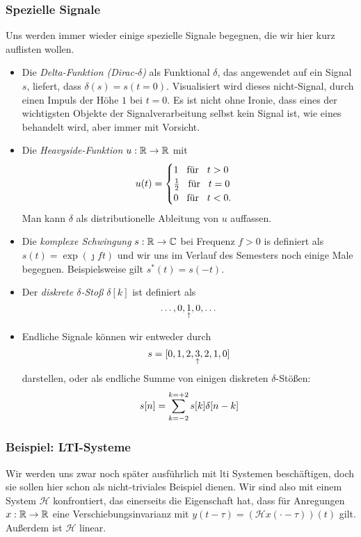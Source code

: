 \subsubsection{Spezielle Signale}
%
Uns werden immer wieder einige spezielle Signale begegnen, die wir hier kurz auflisten wollen.
\begin{itemize}
    \item Die \emph{Delta-Funktion (Dirac-$\delta$)} als Funktional $\delta$, das angewendet auf ein Signal $s$, liefert, dass $\delta(s) = s(t = 0)$. Visualisiert wird dieses nicht-Signal, durch einen Impuls der H\"ohe $1$ bei $t = 0$. Es ist nicht ohne Ironie, dass eines der wichtigsten Objekte der Signalverarbeitung selbst kein Signal ist, wie eines behandelt wird, aber immer mit Vorsicht.
    \item Die \emph{Heavyside-Funktion} $u : \mathbb{R} \rightarrow \mathbb{R}$ mit
    \[
        u(t) = \begin{cases}
            1 {\hspace{3mm} \text{f\"ur} \hspace{3mm}} t>0 \\
            \frac{1}{2} {\hspace{3mm} \text{f\"ur} \hspace{3mm}} t = 0 \\
            0 {\hspace{3mm} \text{f\"ur} \hspace{3mm}} t < 0.
        \end{cases}
    \]
    Man kann $\delta$ als distributionelle Ableitung von $u$ auffassen.
    \item Die \emph{komplexe Schwingung} $s : \mathbb{R} \rightarrow \mathbb{C}$ bei Frequenz $f > 0$ is definiert als 
        $s(t) = \exp(\jmath f t)$
    und wir uns im Verlauf des Semesters noch einige Male begegnen. Beispielsweise gilt $s^\ast(t) = s(-t)$.
    \item Der \emph{diskrete $\delta$-Sto\ss{}} $\delta[k]$ ist definiert als
    \[\dots, 0, \underset{\uparrow}{1}, 0, \dots\]
    \item Endliche Signale k\"onnen wir entweder durch
    \[
        s = [0,1,2,\underset{\uparrow}{3},2,1,0]
    \]
    darstellen, oder als endliche Summe von einigen diskreten $\delta$-St\"o\ss{}en:
    \[
        s[n] = {\sum\limits_{k=-2}^{k=+2}{s}}[k] \delta[n - k]
    \]
\end{itemize}
%
%
\subsubsection{Beispiel: LTI-Systeme}
Wir werden uns zwar noch sp\"ater ausf\"uhrlich mit \gls{lti} Systemen besch\"aftigen, doch sie sollen hier schon als nicht-triviales Beispiel dienen.
Wir sind also mit einem System $\mathcal{H}$ konfrontiert, das einerseits die Eigenschaft hat, dass 
f\"ur Anregungen $x : \mathbb{R} \rightarrow \mathbb{R}$ eine Verschiebungsinvarianz mit $y(t - \tau) = (\mathcal{H}x(\cdot  - \tau))(t)$ gilt. Au\ss{}erdem ist $\mathcal{H}$ linear.

